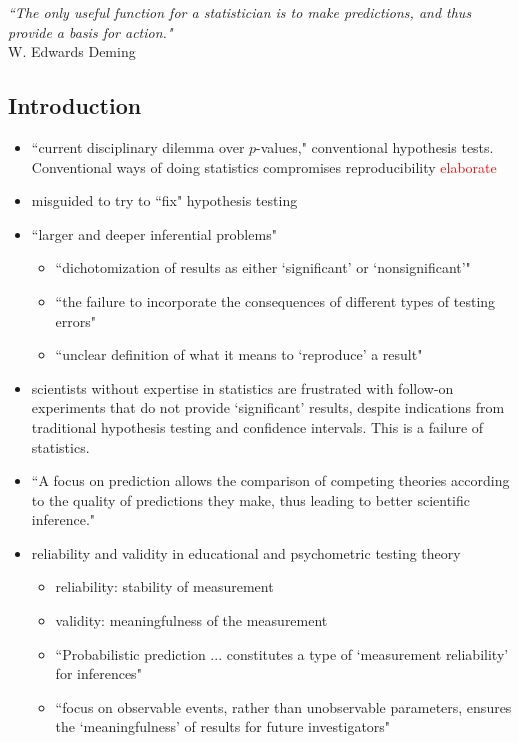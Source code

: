 \documentclass[12pt, a4paper]{article}
\begin{document}
\textit{``The only useful function for a statistician is to make predictions, and thus provide a basis for action."}\\
W. Edwards Deming\\

\subsection{Introduction}

\begin{itemize}
  \item ``current disciplinary dilemma over $p$-values," conventional hypothesis tests.  Conventional ways of doing statistics compromises reproducibility \textcolor{red}{elaborate}
  \item misguided to try to ``fix" hypothesis testing
  \item ``larger and deeper inferential problems"
    \begin{itemize}
      \item ``dichotomization of results as either `significant' or `nonsignificant'"
      \item ``the failure to incorporate the consequences of different types of testing errors"
      \item ``unclear definition of what it means to `reproduce' a result"
    \end{itemize}
  \item scientists without expertise in statistics are frustrated with follow-on experiments that do not provide `significant' results, despite indications from traditional hypothesis testing and confidence intervals.  This is a failure of statistics.
  \item ``A focus on prediction allows the comparison of competing theories according to the quality of predictions they make, thus leading to better scientific inference."
  \item reliability and validity in educational and psychometric testing theory
    \begin{itemize}
      \item reliability:  stability of measurement
      \item validity:  meaningfulness of the measurement
      \item ``Probabilistic prediction ... constitutes a type of `measurement reliability'  for inferences"
      \item ``focus on observable events, rather than unobservable parameters, ensures the `meaningfulness' of results for future investigators"
    \end{itemize}
\end{itemize}
\end{document}
